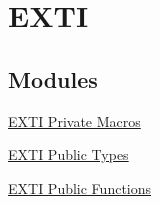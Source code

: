 \hypertarget{group___e_x_t_i}{\section{\-E\-X\-T\-I}
\label{group___e_x_t_i}
}
\subsection*{\-Modules}
\begin{DoxyCompactItemize}
\item 
\hyperlink{group___e_x_t_i___private___macros}{\-E\-X\-T\-I Private Macros}
\item 
\hyperlink{group___e_x_t_i___public___types}{\-E\-X\-T\-I Public Types}
\item 
\hyperlink{group___e_x_t_i___public___functions}{\-E\-X\-T\-I Public Functions}
\end{DoxyCompactItemize}
